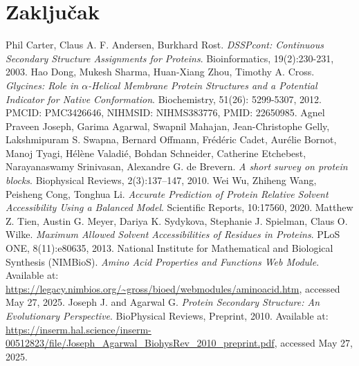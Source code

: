 \documentclass[a4paper,12pt]{article}
\begin{document}
\section{Zaključak}
\newpage
\begin{thebibliography}{5}
    Phil Carter, Claus A. F. Andersen, Burkhard Rost. 
    \textit{DSSPcont: Continuous Secondary Structure Assignments for Proteins}. 
    Bioinformatics, 19(2):230-231, 2003.
    Hao Dong, Mukesh Sharma, Huan-Xiang Zhou, Timothy A. Cross.  
    \textit{Glycines: Role in $\alpha$-Helical Membrane Protein Structures and a Potential Indicator for Native Conformation}.  
    Biochemistry, 51(26): 5299-5307, 2012.  
    PMCID: PMC3426646, NIHMSID: NIHMS383776, PMID: 22650985.
    Agnel Praveen Joseph, Garima Agarwal, Swapnil Mahajan, 
    Jean-Christophe Gelly, Lakshmipuram S. Swapna, Bernard Offmann, 
    Frédéric Cadet, Aurélie Bornot, Manoj Tyagi, Hélène Valadié, Bohdan Schneider, 
    Catherine Etchebest, Narayanaswamy Srinivasan, Alexandre G. de Brevern.  
    \textit{A short survey on protein blocks}.  
    Biophysical Reviews, 2(3):137–147, 2010.
	Wei Wu, Zhiheng Wang, Peisheng Cong, Tonghua Li.  
	\textit{Accurate Prediction of Protein Relative Solvent Accessibility Using a Balanced Model}.  
	Scientific Reports, 10:17560, 2020.
	Matthew Z. Tien, Austin G. Meyer, Dariya K. Sydykova, Stephanie J. Spielman, Claus O. Wilke.  
	\textit{Maximum Allowed Solvent Accessibilities of Residues in Proteins}.  
	PLoS ONE, 8(11):e80635, 2013.
    National Institute for Mathematical and Biological Synthesis (NIMBioS). 
    \textit{Amino Acid Properties and Functions Web Module}. 
    Available at: \url{https://legacy.nimbios.org/~gross/bioed/webmodules/aminoacid.htm}, accessed May 27, 2025.
    Joseph J. and Agarwal G. 
    \textit{Protein Secondary Structure: An Evolutionary Perspective}. 
    BioPhysical Reviews, Preprint, 2010. 
    Available at: \url{https://inserm.hal.science/inserm-00512823/file/Joseph_Agarwal_BiohysRev_2010_preprint.pdf}, accessed May 27, 2025.

\end{thebibliography}
\end{document}
